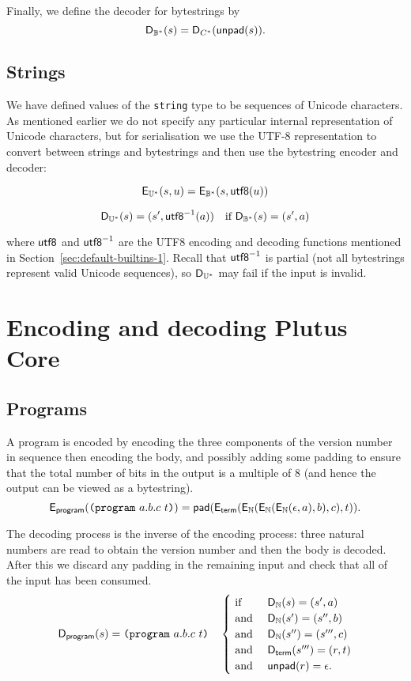\medskip
\noindent Finally, we define the decoder for bytestrings by
$$
\mathsf{D}_{\mathbb{B}^*} (s) = \mathsf{D}_{C^*}(\mathsf{unpad}(s)).
$$

\subsection{Strings}
We have defined values of the \texttt{string} type to be sequences of Unicode
characters.  As mentioned earlier we do not specify any particular internal
representation of Unicode characters, but for serialisation we use the UTF-8
representation to convert between strings and bytestrings and then use the
bytestring encoder and decoder:

$$
\mathsf{E}_{\mathbb{U}^*}(s,u) = \mathsf{E}_{\mathbb{B}^*}(s,\mathsf{utf8}(u))
$$

$$
\mathsf{D}_{\mathbb{U}^*}(s) = (s', \mathsf{utf8}^{-1}(a)) \quad \text{if $\mathsf{D}_{\mathbb{B}^*}(s) = (s', a)$}
$$

\noindent
where $\mathsf{utf8}$ and $\mathsf{utf8}^{-1}$ are the UTF8 encoding and decoding functions
mentioned in Section~\ref{sec:default-builtins-1}. Recall that $\mathsf{utf8}^{-1}$
is partial (not all bytestrings represent valid Unicode sequences), so
$\mathsf{D}_{\mathbb{U}^*}$ may fail if the input is invalid.


\section{Encoding and decoding Plutus Core}

\subsection{Programs}
A program is encoded by encoding the three components of the version number in
sequence then encoding the body, and possibly adding some padding to ensure that
the total number of bits in the output is a multiple of 8 (and hence the output
can be viewed as a bytestring).
$$
\mathsf{E}_{\mathsf{program}}(\texttt{(program}\ a.b.c\ t\texttt{)}) =
\mathsf{pad}(\mathsf{E}_{\mathsf{term}}(\mathsf{E}_{\mathbb{N}}(\mathsf{E}_{\mathbb{N}}(\mathsf{E}_{\mathbb{N}}(\epsilon, a), b), c), t)).
$$

\noindent The decoding process is the inverse of the encoding process: three
natural numbers are read to obtain the version number and then the body is
decoded.  After this we discard any padding in the remaining input and check
that all of the input has been consumed.
$$
\mathsf{D}_{\mathsf{program}}(s) = \texttt{(program}\ a.b.c\ t\texttt{)} \quad
\begin{cases}
  \text{ if }  &\mathsf{D}_{\mathbb{N}}(s) = (s', a)\\
  \text{ and } &\mathsf{D}_{\mathbb{N}}(s') = (s'', b)\\
  \text{ and } &\mathsf{D}_{\mathbb{N}}(s'') = (s''', c)\\
  \text{ and } &\mathsf{D}_{\mathsf{term}}(s''') = (r, t)\\
  \text{ and } &\mathsf{unpad}(r) = \epsilon.
\end{cases}
$$


